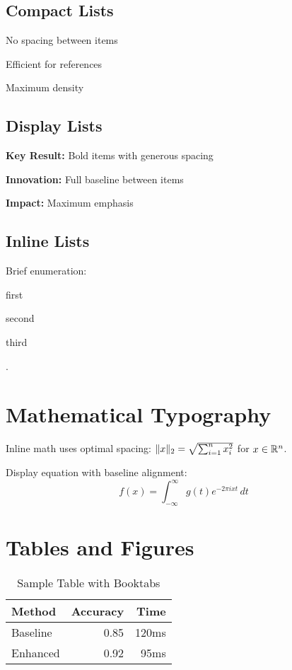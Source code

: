 \documentclass[11pt]{article}
\begin{document}
\subsection{Compact Lists}
\begin{compactitem}
\item No spacing between items
\item Efficient for references
\item Maximum density
\end{compactitem}

\subsection{Display Lists}
\begin{displayitem}
\item \textbf{Key Result:} Bold items with generous spacing
\item \textbf{Innovation:} Full baseline between items
\item \textbf{Impact:} Maximum emphasis
\end{displayitem}

\subsection{Inline Lists}
Brief enumeration: \begin{inlineitem}
\item first \item second \item third
\end{inlineitem}.

\section{Mathematical Typography}

Inline math uses optimal spacing: $\lVert x\rVert_2 = \sqrt{\sum_{i=1}^n x_i^2}$ for $x \in \mathbb{R}^n$.

Display equation with baseline alignment:
\begin{equation}
f(x) = \int_{-\infty}^{\infty} g(t) e^{-2\pi i x t} \, dt
\end{equation}

\section{Tables and Figures}

\begin{table}[tbp]
  \caption{Sample Table with Booktabs}
  \label{tab:test}
  \centering
  \begin{tabular}{@{}lrr@{}}
    \toprule
    Method & Accuracy & Time \\
    \midrule
    Baseline & 0.85 & 120ms \\
    Enhanced & 0.92 & 95ms \\
    \bottomrule
  \end{tabular}
\end{table}
\end{document}
